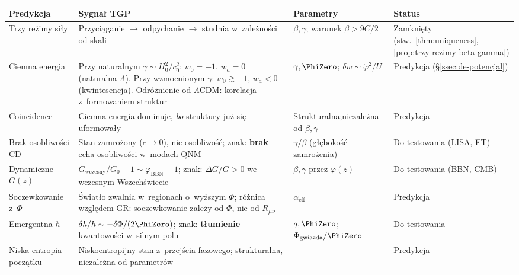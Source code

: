 \begin{center}
\small
\begin{tabular}{@{}>{\raggedright}p{2.5cm}p{5.5cm}p{2.2cm}p{2.5cm}@{}}
\toprule
\textbf{Predykcja} & \textbf{Sygna\l{} TGP}
  & \textbf{Parametry} & \textbf{Status} \\
\midrule
Trzy re\.zimy si\l{}y
  & Przyci\k{a}ganie $\to$ odpychanie $\to$ studnia
    w~zale\.zno\'sci od skali
  & $\beta, \gamma$; warunek $\beta > 9C/2$
  & Zamkni\k{e}ty (stw.~\ref{thm:uniqueness}, \ref{prop:trzy-rezimy-beta-gamma}) \\[4pt]
Ciemna energia
  & Przy naturalnym $\gamma \sim H_0^2/c_0^2$:
    $w_0 = -1$, $w_a = 0$ (naturalna $\Lambda$).
    Przy wzmocnionym $\gamma$:
    $w_0 \gtrsim -1$, $w_a < 0$ (kwintesencja).
    Odr\'o\.znienie od $\Lambda$CDM: korelacja z~formowaniem
    struktur
  & $\gamma, \PhiZero$;\newline
    $\delta w \sim \dot\varphi^2/U$
  & Predykcja (\S\ref{ssec:de-potencjal}) \\[4pt]
Coincidence
  & Ciemna energia dominuje, \emph{bo} struktury
    ju\.z si\k{e} uformowa\l{}y
  & Strukturalna;\newline niezale\.zna od $\beta,\gamma$
  & Predykcja \\[4pt]
Brak osobliwo\'sci CD
  & Stan zamro\.zony ($c \to 0$),
    nie osobliwo\'s\'c; znak: \textbf{brak}
    echa osobliwo\'sci w~modach QNM
  & $\gamma/\beta$ (g\l{}\k{e}boko\'s\'c zamro\.zenia)
  & Do testowania (LISA, ET) \\[4pt]
Dynamiczne $G(z)$
  & $G_{\mathrm{wczesny}}/G_0 - 1
    \sim \varphi_{\mathrm{BBN}} - 1$;
    znak: $\Delta G/G > 0$ we wczesnym
    Wszech\'swiecie
  & $\beta, \gamma$ przez $\varphi(z)$
  & Do testowania (BBN, CMB) \\[4pt]
Soczewkowanie z~$\Phi$
  & \'Swiat\l{}o zwalnia w~regionach
    o~wy\.zszym $\Phi$; r\'o\.znica wzgl\k{e}dem GR:
    soczewkowanie zale\.zy od $\Phi$, nie od $R_{\mu\nu}$
  & $\alpha_{\mathrm{eff}}$
  & Predykcja \\[4pt]
Emergentna $\hbar$
  & $\delta\hbar/\hbar \sim -\delta\Phi/(2\PhiZero)$;
    znak: \textbf{t\l{}umienie} kwantowo\'sci
    w~silnym polu
  & $q, \PhiZero$;\newline
    $\Phi_{\mathrm{gwiazda}}/\PhiZero$
  & Do testowania \\[4pt]
Niska entropia pocz\k{a}tku
  & Niskoentropijny stan z~przej\'scia fazowego;
    strukturalna, niezale\.zna od parametr\'ow
  & ---
  & Predykcja \\[4pt]

\end{tabular}
\end{center}
